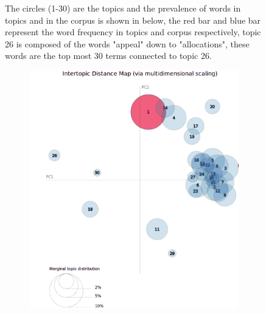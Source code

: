 \begin{figure}[h!]
\begin{subfigure}[h]{0.60\textwidth}
        \label{fig:trapez2}
    \end{subfigure}
    \caption{The circles (1-30) are the topics and the prevalence of words in topics and in the corpus is shown in below, the red bar and blue bar represent the word frequency in topics and corpus respectively, topic 26 is composed of the words "appeal" down to "allocations", these words are the top most 30 terms connected to topic 26.}\label{figure 4.5}
\end{figure}
\newpage
\begin{figure}[h!]
    \centering
    \begin{subfigure}[h]{0.60\textwidth}
        \includegraphics[width=\textwidth]{c4_7_orig.png}
        \label{fig:trapez1}
    \end{subfigure}
    ~ %
    \begin{subfigure}[h]{0.60\textwidth}

\end{subfigure}
\end{figure}
